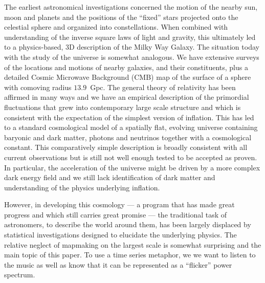 \documentclass[useAMS,usenatbib,a4paper]{mn2e}
\begin{document}
The earliest astronomical investigations concerned the motion of the
nearby sun, moon and planets  and the positions of the ``fixed'' stars
projected onto the celestial sphere and organized into constellations.
When combined with understanding of the inverse square laws of light
and gravity, this ultimately led to a physics-based, 3D description of
the Milky Way Galaxy. The situation today with the study of the
universe is somewhat analogous. We have extensive surveys of the
locations and motions of nearby galaxies, and their constituents, plus
a detailed Cosmic Microwave Background (CMB) map of the surface of a
sphere with comoving radius $13.9$~Gpc. The general theory of
relativity has been affirmed in many ways and we have an empirical
description of the primordial fluctuations that grew into contemporary
large scale structure and which is consistent with the expectation of
the simplest version of inflation. This has led to a standard
cosmological model of a spatially flat, evolving universe containing
baryonic and dark matter, photons and neutrinos together with a
cosmological constant. This comparatively simple description is
broadly consistent with all current observations but is still not well
enough tested to be accepted as proven. In particular, the
acceleration of the universe might be driven by a more complex dark
energy field and we still lack identification of dark matter and
understanding of the physics underlying inflation. 

However, in developing this cosmology --- a program that has made
great progress and which still carries great promise --- the
traditional task of astronomers, to describe the world around
them, has been largely displaced by statistical investigations
designed to elucidate the underlying physics. The relative neglect of mapmaking on the largest scale is somewhat surprising and the main topic of this paper. To use a time series metaphor, we we want to listen to the
music as well as know that it can be represented as a ``flicker''
power spectrum. 
\end{document}
